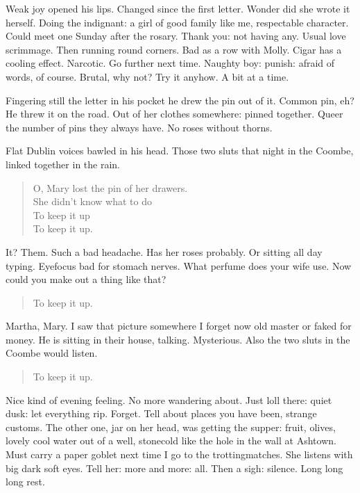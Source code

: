 Weak joy opened his lips.
Changed since the first letter.
Wonder did she wrote it herself.
Doing the indignant:
a girl of good family like me, respectable character.
Could meet one Sunday after the rosary.
Thank you: not having any.
Usual love scrimmage.
Then running round corners.
Bad as a row with Molly.
Cigar has a cooling effect.
Narcotic.
Go further next time.
Naughty boy:
punish:
afraid of words, of course.
Brutal, why not?
Try it anyhow.
A bit at a time.

Fingering still the letter in his pocket
he drew the pin out of it.
Common pin, eh?
He threw it on the road.
Out of her clothes somewhere:
pinned together.
Queer the number of pins they always have.
No roses without thorns.

Flat Dublin voices bawled in his head.
Those two sluts that night in the Coombe, linked together in the rain.

\begin{verse}
    O, Mary lost the pin of her drawers. \\
    She didn't know what to do \\
    To keep it up \\
    To keep it up.
\end{verse}


It?
Them.
Such a bad headache.
Has her roses probably.
Or sitting all day typing.
Eyefocus bad for stomach nerves.
What perfume does your wife use.
Now could you make out a thing like that?

\begin{verse}
    To keep it up.
\end{verse}

Martha, Mary.
I saw that picture somewhere I forget now
old master or faked for money.
He is sitting in their house, talking.
Mysterious.
Also the two sluts in the Coombe would listen.

\begin{verse}
    To keep it up.
\end{verse}

Nice kind of evening feeling.
No more wandering about.
Just loll there:
quiet dusk:
let everything rip.
Forget.
Tell about places you have been,
strange customs.
The other one,
jar on her head,
was getting the supper:
fruit, olives,
lovely cool water out of a well,
stonecold like the hole in the wall at Ashtown.
Must carry a paper goblet next time I go to the trottingmatches.
She listens with big dark soft eyes.
Tell her:
more and more:
all.
Then a sigh:
silence.
Long long long rest.

